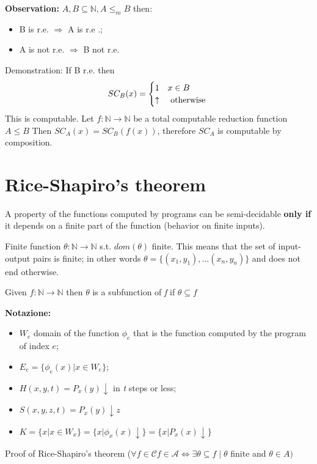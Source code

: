 \documentclass{amsbook}
\newcommand{\nat}{\ensuremath{\mathbb{N}}}
\theoremstyle{definition}
\theoremstyle{remark}
\numberwithin{section}{chapter}
\numberwithin{equation}{chapter}
\begin{document}
\textbf{Observation:} $ A,B \subseteq \nat, A\leq_m B $ then:
\begin{itemize}
	\item B is r.e. $ \Rightarrow $ A is r.e .;
	\item A is not r.e. $ \Rightarrow $ B not r.e.
\end{itemize}
Demonstration: If B r.e. then
\begin{equation*}
	SC_B(x) = \begin{cases}
		1        & x \in B       \\
		\uparrow & $ otherwise $
	\end{cases}
\end{equation*}
This is computable. Let $ f:\nat\rightarrow\nat $ be a total computable reduction function\\  $ A\leq B $ Then $ SC_A(x) = SC_B(f(x)) $, therefore $ SC_A $ is computable by composition.

\chapter {Rice-Shapiro's theorem}
A property of the functions computed by programs can be semi-decidable \textbf{only if} it depends on a finite part of the function (behavior on finite inputs).

Finite function $ \theta: \nat\rightarrow\nat $ s.t. $ dom(\theta) $ finite. This means that the set of input-output pairs is finite; in other words $ \theta = \{(x_1,y_1),\dots(x_n,y_n) \} $ and does not end otherwise.

Given $ f:\nat\rightarrow\nat $ then $ \theta  $ is a subfunction of \textit{f} if $ \theta \subseteq f $

\textbf{Notazione:}
\begin{itemize}
\item $ W_e $ domain of the function $ \phi_e $ that is the function computed by the program of index $e$;
\item $ E_e = \{\phi_e(x)|x\in W_e \}$;
\item $ H(x,y,t) = P_x(y)\downarrow $ in \textit{t} steps or less;
\item $ S(x,y,z,t) = P_x(y)\downarrow z $
\item $ K = \{x|x\in W_x \} = \{x|\phi_x(x)\downarrow \} = \{x|P_x(x)\downarrow \}$
\end{itemize}

Proof of Rice-Shapiro's theorem ($ \forall f \in \mathcal{C} f \in \mathcal{A} \Leftrightarrow \exists\theta\subseteq f \mid \theta $ finite and $ \theta\in A) $
\end{document}

